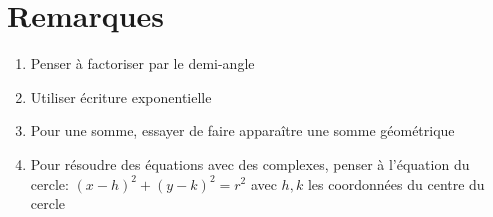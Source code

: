 \documentclass[fleqn]{article}
\theoremstyle{definition} \newtheorem*{defi}{D\'efinition}
\theoremstyle{definition} \newtheorem*{theo}{Th\'eor\`eme}
\theoremstyle{definition} \newtheorem*{coro}{Corollaire}
\theoremstyle{remark} \newtheorem*{rqs}{Remarques}
\theoremstyle{definition} \newtheorem*{prop}{Propri\'et\'e}
\begin{document}
\section{Remarques}
\begin{enumerate}
	\item Penser \`a factoriser par le demi-angle
	\item Utiliser \'ecriture exponentielle
	\item Pour une somme, essayer de faire appara\^itre une somme g\'eom\'etrique
	\item Pour r\'esoudre des \'equations avec des complexes, penser \`a l'\'equation du cercle: $(x-h)^2 + (y-k)^2=r^2$ avec $h,k$ les
		coordonn\'ees du centre du cercle
\end{enumerate}
\end{document}
